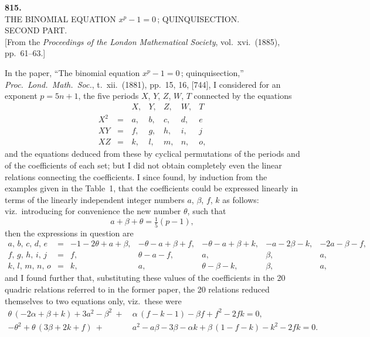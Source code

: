 \documentclass[11pt,a4paper]{article}
\begin{document}
\fancyhead[C]{\small\ }
\fancyhead[R]{\small [815}

\thispagestyle{plain}
\begin{center}
\vspace*{2em}
{\Large\bfseries 815.}\\[1.5em]
{\normalsize\scshape THE BINOMIAL EQUATION $x^{p} - 1 = 0$\,; QUINQUISECTION.}\\[0.3em]
{\normalsize\scshape SECOND PART.}\\[1em]
{\small [From the \textit{Proceedings of the London Mathematical Society}, vol.~xvi.\ (1885), pp.~61--63.]}
\end{center}

\medskip
\noindent In the paper, ``The binomial equation $x^{p} - 1 = 0$\,; quinquisection,'' \textit{Proc.\ Lond.\ Math.\ Soc.}, t.~xii.\ (1881), pp.~15, 16, [744], I considered for an exponent $p = 5n + 1$, the five periods $X$, $Y$, $Z$, $W$, $T$ connected by the equations
\[
\begin{array}{lcccccc}
       &     & X, & Y, & Z, & W, & T\\
X^{2}  & =\, & a, & b, & c, & d, & e\\
XY     & =\, & f, & g, & h, & i, & j\\
XZ     & =\, & k, & l, & m, & n, & o,
\end{array}
\]
and the equations deduced from these by cyclical permutations of the periods and of the coefficients of each set; but I did not obtain completely even the linear relations connecting the coefficients.  I since found, by induction from the examples given in the Table~1, that the coefficients could be expressed linearly in terms of the linearly independent integer numbers $a$, $\beta$, $f$, $k$ as follows: viz.\ introducing for convenience the new number $\theta$, such that
\[
a + \beta + \theta = \tfrac{1}{5}(p - 1),
\]
then the expressions in question are
\[
\begin{array}{ccccccc}
a,\,b,\,c,\,d,\,e &=& -1 - 2\theta + a + \beta, & -\theta - a + \beta + f, & -\theta - a + \beta + k, & -a - 2\beta - k, & -2a - \beta - f,\\
f,\,g,\,h,\,i,\,j  &=& f, & \theta - a - f, & a, & \beta, & a,\\
k,\,l,\,m,\,n,\,o  &=& k, & a, & \theta - \beta - k, & \beta, & a,
\end{array}
\]
and I found further that, substituting these values of the coefficients in the 20 quadric relations referred to in the former paper, the 20 relations reduced themselves to two equations only, viz.\ these were
\[
\begin{aligned}
\theta\,(-2\alpha + \beta + k) + 3a^{2} - \beta^{2}\ +\ &\alpha\,(f - k - 1) - \beta f + f^{2} - 2fk = 0,\\
-\theta^{2} + \theta\,(3\beta + 2k + f)\ +\ &a^{2} - a\beta - 3\beta - \alpha k + \beta\,(1 - f - k) - k^{2} - 2fk = 0.
\end{aligned}
\]
\clearpage
\end{document}
